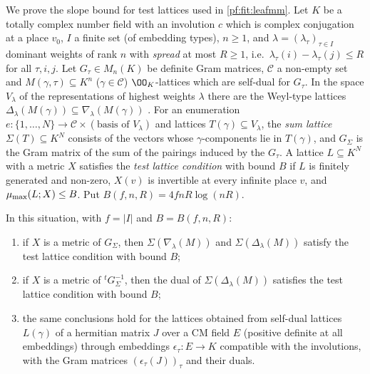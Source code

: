We prove the slope bound for test lattices used in \cref{pf:fit:leafmm}. Let $K$ be a totally complex number field with an
involution $c$ which is complex conjugation at a place $v_0$, $I$ a finite set (of embedding types), $n\ge1$, and
$\lambda=(\lambda_\tau)_{\tau\in I}$ dominant weights of rank $n$ with \emph{spread} at most $R\ge1$, i.e.\
$\lambda_\tau(i)-\lambda_\tau(j)\le R$ for all $\tau,i,j$. Let $G_\tau\in M_n(K)$ be definite Gram matrices, $\mathcal C$ a non-empty
set and $M(\gamma,\tau)\subseteq K^n$ ($\gamma\in\mathcal C$) $\OO_K$-lattices which are self-dual for $G_\tau$. In the space
$V_\lambda$ of the representations of highest weights $\lambda$ there are the Weyl-type lattices
$\Delta_\lambda(M(\gamma))\subseteq\nabla_\lambda(M(\gamma))$ \cite{LeanSource2026}. For an enumeration
$e\colon\{1,\dots,N\}\to\mathcal C\times(\text{basis of }V_\lambda)$ and lattices $T(\gamma)\subseteq V_\lambda$, the \emph{sum
lattice} $\Sigma(T)\subseteq K^N$ consists of the vectors whose $\gamma$-components lie in $T(\gamma)$, and $G_\Sigma$ is the
Gram matrix of the sum of the pairings induced by the $G_\tau$. A lattice $L\subseteq K^N$ with a metric $X$ satisfies the
\emph{test lattice condition} with bound $B$ if $L$ is finitely generated and non-zero, $X(v)$ is invertible at every infinite place
$v$, and $\mu_{\max}(L;X)\le B$. Put $B(f,n,R)=4fnR\log(nR)$.

\begin{theorem}[Slopes of sums of Weyl lattices]\label{pf:fit:testlat}
In this situation, with $f=|I|$ and $B=B(f,n,R)$:
\begin{enumerate}[label=(\alph*)]
\item if $X$ is a metric of $G_\Sigma$, then $\Sigma(\nabla_\lambda(M))$ and $\Sigma(\Delta_\lambda(M))$ satisfy the test lattice
condition with bound $B$;
\item if $X$ is a metric of ${}^tG_\Sigma^{-1}$, then the dual of $\Sigma(\Delta_\lambda(M))$ satisfies the test lattice condition
with bound $B$;
\item the same conclusions hold for the lattices obtained from self-dual lattices $L(\gamma)$ of a hermitian matrix $J$ over a CM
field $E$ (positive definite at all embeddings) through embeddings $\epsilon_\tau\colon E\to K$ compatible with the involutions,
with the Gram matrices $(\epsilon_\tau(J))_\tau$ and their duals.
\end{enumerate}
\end{theorem}

